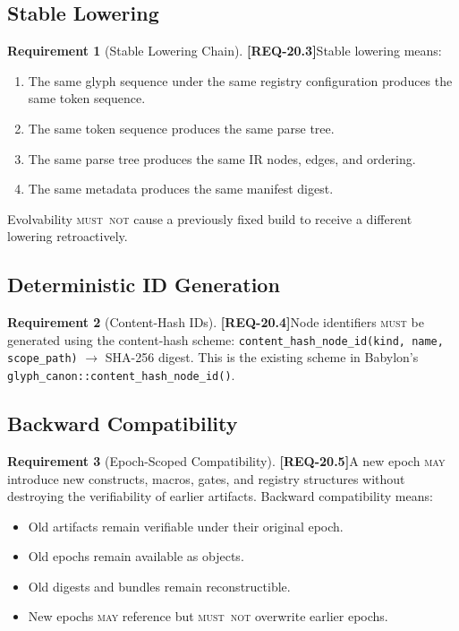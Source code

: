 \documentclass[11pt,a4paper,twoside]{article}
\theoremstyle{definition}
\newtheorem{requirement}{Requirement}[section]
\theoremstyle{remark}
\newcommand{\req}[1]{\textbf{\textcolor{reqred}{[REQ-#1]}}}
\newcommand{\must}{\textsc{must}}
\newcommand{\mustnot}{\textsc{must~not}}
\newcommand{\may}{\textsc{may}}
\begin{document}
\subsection{Stable Lowering}

\begin{requirement}[Stable Lowering Chain]
\label{req:stable-lowering}
\req{20.3}\quad Stable lowering means:
\begin{enumerate}[label=(\roman*),nosep]
  \item The same glyph sequence under the same registry configuration produces the same token sequence.
  \item The same token sequence produces the same parse tree.
  \item The same parse tree produces the same IR nodes, edges, and ordering.
  \item The same metadata produces the same manifest digest.
\end{enumerate}
Evolvability \mustnot{} cause a previously fixed build to receive a different lowering retroactively.
\end{requirement}

\subsection{Deterministic ID Generation}

\begin{requirement}[Content-Hash IDs]
\label{req:content-hash}
\req{20.4}\quad Node identifiers \must{} be generated using the content-hash scheme: \texttt{content\_hash\_node\_id(kind, name, scope\_path)} $\to$ SHA-256 digest. This is the existing scheme in Babylon's \texttt{glyph\_canon::content\_hash\_node\_id()}.
\end{requirement}

\subsection{Backward Compatibility}

\begin{requirement}[Epoch-Scoped Compatibility]
\label{req:backward-compat}
\req{20.5}\quad A new epoch \may{} introduce new constructs, macros, gates, and registry structures without destroying the verifiability of earlier artifacts. Backward compatibility means:
\begin{itemize}[nosep]
  \item Old artifacts remain verifiable under their original epoch.
  \item Old epochs remain available as objects.
  \item Old digests and bundles remain reconstructible.
  \item New epochs \may{} reference but \mustnot{} overwrite earlier epochs.
\end{itemize}
\end{requirement}
\end{document}
